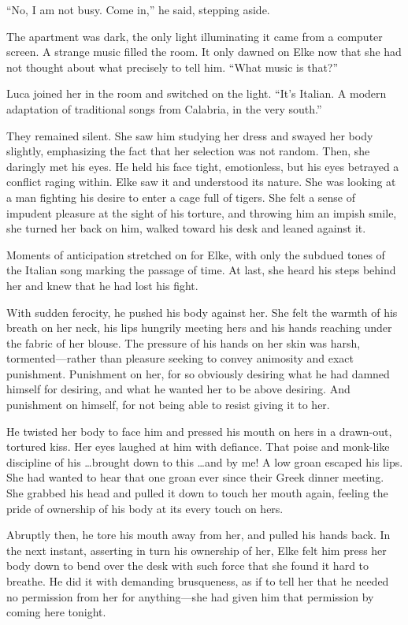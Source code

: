 ``No, I am not busy. Come in,'' he said, stepping aside.

The apartment was dark, the only light illuminating it came from a computer screen. A strange music filled the room. It only dawned on Elke now that she had not thought about what precisely to tell him. ``What music is that?''

Luca joined her in the room and switched on the light. ``It's Italian. A modern adaptation of traditional songs from Calabria, in the very south.''

They remained silent. She saw him studying her dress and swayed her body slightly, emphasizing the fact that her selection was not random. Then, she daringly met his eyes. He held his face tight, emotionless, but his eyes betrayed a conflict raging within. Elke saw it and understood its nature. She was looking at a man fighting his desire to enter a cage full of tigers. She felt a sense of impudent pleasure at the sight of his torture, and throwing him an impish smile, she turned her back on him, walked toward his desk and leaned against it.

Moments of anticipation stretched on for Elke, with only the subdued tones of the Italian song marking the passage of time. At last, she heard his steps behind her and knew that he had lost his fight.

With sudden ferocity, he pushed his body against her. She felt the warmth of his breath on her neck, his lips hungrily meeting hers and his hands reaching under the fabric of her blouse. The pressure of his hands on her skin was harsh, tormented---rather than pleasure seeking to convey animosity and exact punishment. Punishment on her, for so obviously desiring what he had damned himself for desiring, and what he wanted her to be above desiring. And punishment on himself, for not being able to resist giving it to her.

He twisted her body to face him and pressed his mouth on hers in a drawn-out, tortured kiss. Her eyes laughed at him with defiance. That poise and monk-like discipline of his \ldots brought down to this \ldots and by me! A low groan escaped his lips. She had wanted to hear that one groan ever since their Greek dinner meeting. She grabbed his head and pulled it down to touch her mouth again, feeling the pride of ownership of his body at its every touch on hers.

Abruptly then, he tore his mouth away from her, and pulled his hands back. In the next instant, asserting in turn his ownership of her, Elke felt him press her body down to bend over the desk with such force that she found it hard to breathe. He did it with demanding brusqueness, as if to tell her that he needed no permission from her for anything---she had given him that permission by coming here tonight.

